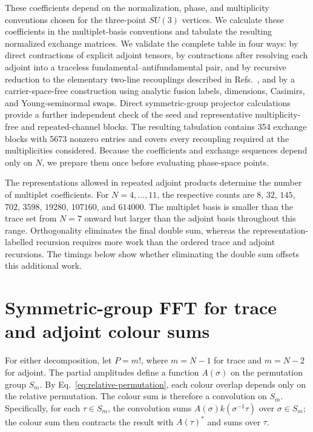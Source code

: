 \documentclass[aps,prd,twocolumn,superscriptaddress,nofootinbib]{revtex4-2}
\begin{document}
These coefficients depend on the normalization, phase, and multiplicity
conventions chosen for the three-point $SU(3)$ vertices.  We calculate these
coefficients in the multiplet-basis conventions and tabulate the resulting
normalized exchange matrices.  We validate the complete table in four ways: by
direct contractions of explicit adjoint tensors, by contractions after
resolving each adjoint into a traceless fundamental--antifundamental pair, and
by recursive reduction to the elementary two-line recouplings described in
Refs.~\cite{Alcock-Zeilinger:2022hrk,Keppeler:2023msu}, and by a
carrier-space-free construction using analytic fusion labels, dimensions,
Casimirs, and Young-seminormal swaps.  Direct symmetric-group projector
calculations provide a further independent check of the seed and representative
multiplicity-free and repeated-channel blocks.  The resulting
tabulation contains 354 exchange blocks with 5673 nonzero entries and covers
every recoupling required at the multiplicities considered.  Because the
coefficients and exchange sequences depend only on $N$, we prepare them once
before evaluating phase-space points.

The representations allowed in repeated adjoint products determine the
number of multiplet coefficients.  For $N=4,\ldots,11$, the respective counts
are $8$, $32$, $145$, $702$, $3598$, $19280$, $107160$, and $614000$.
The multiplet basis is smaller than the trace set from $N=7$ onward but larger
than the adjoint basis throughout this range.
Orthogonality eliminates the final double sum, whereas the
representation-labelled recursion requires more work than the ordered trace
and adjoint recursions.  The timings below show whether eliminating the double
sum offsets this additional work.

\section{Symmetric-group FFT for trace and adjoint colour sums}
\label{sec:fft}

For either decomposition, let $P=m!$, where $m=N-1$ for trace and $m=N-2$
for adjoint.  The partial amplitudes define a function $A(\sigma)$ on the
permutation group $S_m$.  By Eq.~\eqref{eq:relative-permutation}, each colour
overlap depends only on the relative permutation.  The colour sum is therefore
a convolution on $S_m$.  Specifically, for each $\tau\in S_m$, the
convolution sums $A(\sigma)k(\sigma^{-1}\tau)$ over $\sigma\in S_m$; the
colour sum then contracts the result with $A(\tau)^*$ and sums over $\tau$.
\end{document}
